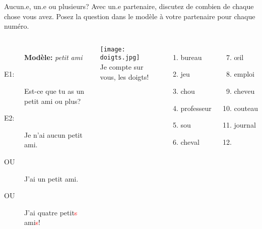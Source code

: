 \begin{frame}{Aucun.e, un.e ou plusieurs?}
  Avec un.e partenaire, discutez de combien de chaque chose vous avez.
  Posez la question dans le modèle à votre partenaire pour chaque numéro.
  \begin{columns}
      \small
      \begin{description}
        \item[] \textbf{Modèle:} \emph{petit ami}
        \item[E1:] Est-ce que tu as un petit ami ou plus?
        \item[E2:] Je n'ai aucun petit ami.
        \item[OU] J'ai un petit ami.
        \item[OU] J'ai \alert{quatre} petit\textcolor{red}{s} ami\textcolor{red}{s}!
      \end{description}
      \begin{center}
        \texttt{[image: doigts.jpg]} \\
        \tiny
        Je compte sur vous, les doigts!
      \end{center}
      \begin{enumerate}
        \item bureau
        \item jeu
        \item chou
        \item professeur
        \item sou
        \item cheval
      \end{enumerate}
      \begin{enumerate}
        \setcounter{enumi}{6}
        \item œil
        \item emploi
        \item cheveu
        \item couteau
        \item journal
        \item[] \ 
      \end{enumerate}
  \end{columns}
\end{frame}